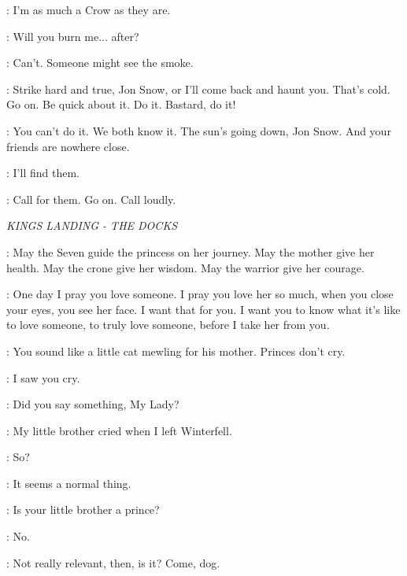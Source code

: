 \JON: I'm as much a Crow as they are. 

\YGRITTE: Will you burn me$\ldots$ after? 

\JON: Can't. Someone might see the smoke. 

\YGRITTE: Strike hard and true, Jon Snow, or I'll come back and haunt you. That's cold. Go on. Be quick about it. Do it. Bastard, do it! 


\YGRITTE: You can't do it. We both know it. The sun's going down, Jon Snow. And your friends are nowhere close. 

\JON: I'll find them. 

\YGRITTE: Call for them.  Go on. Call loudly. 


\scene

\textit{KINGS LANDING - THE DOCKS} 


\HIGHSEPTON: May the Seven guide the princess on her journey. 
May the mother give her health. 
May the crone give her wisdom. 
May the warrior give her courage. 

\CERSEI:   One day I pray you love someone. I pray you love her so much, when you close your eyes, you see her face. I want that for you. I want you to know what it's like to love someone, to truly love someone, before I take her from you.


\JOFFREY:  You sound like a little cat mewling for his mother. Princes don't cry. 

\SANSA: I saw you cry. 

\JOFFREY: Did you say something, My Lady? 

\SANSA: My little brother cried when I left Winterfell. 

\JOFFREY: So? 

\SANSA: It seems a normal thing. 

\JOFFREY: Is your little brother a prince? 

\SANSA: No. 

\JOFFREY: Not really relevant, then, is it?  Come, dog. 

